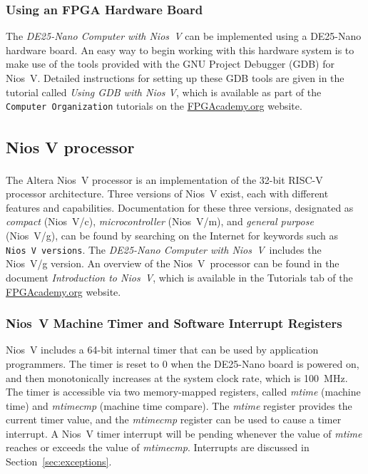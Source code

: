 \documentclass[11pt, twoside, pdftex]{article}
\newcommand{\DEBoard}{DE25-Nano}
\newcommand{\systemNameFull}{DE25-Nano Computer with Nios~V}
\newcommand{\processor}{Nios~V}
\begin{document}
\subsubsection {Using an FPGA Hardware Board}

The {\it \systemNameFull} can be implemented using a {\DEBoard} hardware
board.  An easy way to begin working with this hardware system is to make use of the tools
provided with the GNU Project Debugger (GDB) for Nios~V. Detailed instructions for setting up 
these GDB tools are given in the tutorial called {\it Using GDB with Nios V}, which is available
as part of the \texttt{Computer Organization} tutorials on the 
{\small \href{https://www.fpgacademy.org/tutorials.html} {FPGAcademy.org}} website.

\subsection{Nios\textsuperscript{\textregistered} V processor}
\label{sec:niosV}
The Altera Nios\textsuperscript{\textregistered}~V processor 
is an implementation of the 32-bit RISC-V processor architecture. Three versions of 
Nios~V exist, each with different features and capabilities.  Documentation for these 
three versions, designated as {\it compact} (Nios~V/c), {\it microcontroller} (Nios~V/m),
and {\it general purpose} (Nios~V/g), can be found by searching on the Internet for keywords 
such as \texttt{Nios~V versions}. The {\it \systemNameFull}~includes 
the Nios~V/g version. An overview of the \processor~processor can be found in the 
document {\it Introduction to \processor}, which is available in the 
Tutorials tab of the 
{\small \href{https://www.fpgacademy.org/tutorials.html} {FPGAcademy.org}} website.

\subsubsection{Nios~V Machine Timer and Software Interrupt Registers}
\label{sec:mtimer}
Nios~V includes a 64-bit internal timer that can be used by application programmers. 
The timer is reset to 0 when the {\DEBoard} board is powered on, and then monotonically
increases at the system clock rate, which is 100~MHz. The timer is accessible via two 
memory-mapped registers, 
called {\it mtime} (machine time) and {\it mtimecmp} (machine time compare). The 
{\it mtime} register provides the current timer value, and the {\it mtimecmp} register 
can be used to cause a timer interrupt. A Nios~V timer interrupt will be pending whenever 
the value of {\it mtime} reaches or exceeds the value of {\it mtimecmp}. Interrupts are 
discussed in Section~\ref{sec:exceptions}.
\end{document}

